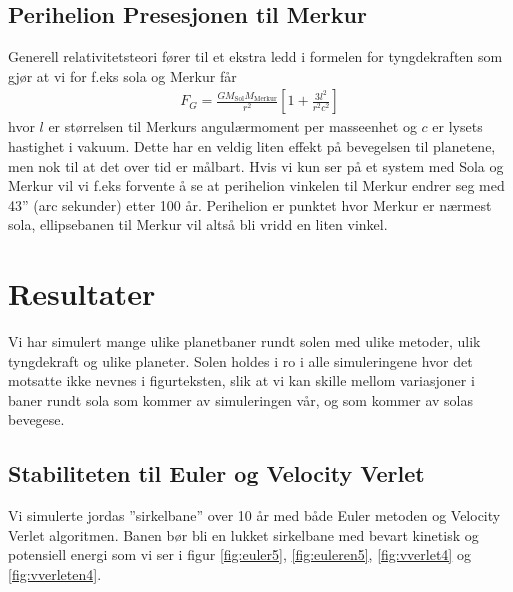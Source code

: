 \documentclass[reprint,english,notitlepage]{revtex4-1}
\begin{document}
\subsection{Perihelion Presesjonen til Merkur}
	Generell relativitetsteori fører til et ekstra ledd i formelen for tyngdekraften som gjør at vi for f.eks sola og Merkur får
	\begin{equation}
	\begin{aligned}
	F_G = \frac{GM_\mathrm{Sol}M_\mathrm{Merkur}}{r^2}\left[1 + \frac{3l^2}{r^2c^2}\right]
	\end{aligned}
	\end{equation}
	hvor $l$ er størrelsen til Merkurs angulærmoment per masseenhet og $c$ er lysets hastighet i vakuum. Dette har en veldig liten effekt på bevegelsen til planetene, men nok til at det over tid er målbart. Hvis vi kun ser på et system med Sola og Merkur vil vi f.eks forvente å se at perihelion vinkelen til Merkur endrer seg med 43'' (arc sekunder) etter 100 år. Perihelion er punktet hvor Merkur er nærmest sola, ellipsebanen til Merkur vil altså bli vridd en liten vinkel.
	

\section{Resultater} %
	Vi har simulert mange ulike planetbaner rundt solen med ulike metoder, ulik tyngdekraft og ulike planeter. Solen holdes i ro i alle simuleringene hvor det motsatte ikke nevnes i figurteksten, slik at vi kan skille mellom variasjoner i baner rundt sola som kommer av simuleringen vår, og som kommer av solas bevegese.

\subsection{Stabiliteten til Euler og Velocity Verlet}
	Vi simulerte jordas ''sirkelbane'' over 10 år med både Euler metoden og Velocity Verlet algoritmen. Banen bør bli en lukket sirkelbane med bevart kinetisk og potensiell energi som vi ser i figur \ref{fig:euler5}, \ref{fig:euleren5}, \ref{fig:vverlet4} og \ref{fig:vverleten4}.
	
\end{document}
